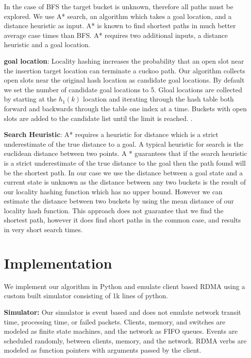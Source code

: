 In the case of BFS the target bucket is unknown, therefore
all paths must be explored. We use A* search, an algorithm
which takes a goal location, and a distance heuristic as
input. A* is known to find shortest paths in much better
average case times than BFS. A* requires two additional
inputs, a distance heuristic and a goal location.

\textbf{goal location}: Locality hashing increases the
probability that an open slot near the insertion target
location can terminate a cuckoo path. Our algorithm collects
open slots near the original hash location as candidate goal
locations. By default we set the number of candidate goal
locations to 5. Gloal locations are collected by starting at
the $h_1(k)$ location and iterating through the hash
table both forward and backwards through the table one index
at a time. Buckets with open slots are added to the
candidate list until the limit is reached. .

\textbf{Search Heuristic}: A* requires a heuristic for
distance which is a strict underestimate of the true
distance to a goal. A typical heuristic for search is the
euclidean distance between two points. A * guarantees that
if the search heuristic is a strict underestimate of the
true distance to the goal then the path found will be the
shortest path. In our case we use the distance between a
goal state and a current state is unknown as the distance
between any two buckets is the result of our locality
hashing function which has no upper bound. However we can
estimate the distance between two buckets by using the mean
distance of our locality hash function. This approach does
not guarantee that we find the shortest path, however it
does find short paths in the common case, and results in
very short search times.

\section{Implementation} We implement our algorithm in
Python and emulate client based RDMA using a custom built
simulator consisting of 1k lines of python. 

\textbf{Simulator:} Our simulator is event based and does
not emulate network transit time, processing time, or failed
packets. Clients, memory, and switches are modeled as finite
state machines, and the network as FIFO queues. Events are
scheduled randomly, between clients, memory, and the
network. RDMA verbs are modeled as function pointers with
arguments passed by the client.

